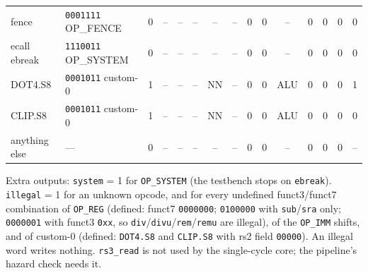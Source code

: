\documentclass[10pt]{article}
\newcommand{\sv}[1]{\texttt{#1}}
\begin{document}
\begin{center}
\begin{tabular}{l l c c c l c c c c c c c c c}
fence                   & \sv{0001111} OP\_FENCE  & 0 & --& --& --       & --  & --  & 0 & 0 & --  & 0 & 0 & 0 & 0\\
ecall ebreak            & \sv{1110011} OP\_SYSTEM & 0 & --& --& --       & --  & --  & 0 & 0 & --  & 0 & 0 & 0 & 0\\
DOT4.S8                 & \sv{0001011} custom-0   & 1 & --& --& --       & NN  & --  & 0 & 0 & ALU & 0 & 0 & 0 & 1\\
CLIP.S8                 & \sv{0001011} custom-0   & 1 & --& --& --       & NN  & --  & 0 & 0 & ALU & 0 & 0 & 0 & 0\\
anything else           & ---                     & 0 & --& --& --       & --  & --  & 0 & 0 & --  & 0 & 0 & 0 & --\\
\bottomrule
\end{tabular}
\end{center}
\noindent Extra outputs: \sv{system} = 1 for \sv{OP\_SYSTEM} (the testbench stops on \sv{ebreak}).
\sv{illegal} = 1 for an unknown opcode, and for every undefined funct3/funct7 combination of
\sv{OP\_REG} (defined: funct7 \sv{0000000}; \sv{0100000} with \sv{sub}/\sv{sra} only; \sv{0000001} with funct3 \sv{0xx},
so \sv{div}/\sv{divu}/\sv{rem}/\sv{remu} are illegal), of the \sv{OP\_IMM} shifts, and of custom-0
(defined: \sv{DOT4.S8} and \sv{CLIP.S8} with rs2 field \sv{00000}). An illegal word writes nothing.
\sv{rs3\_read} is not used by the single-cycle core; the pipeline's hazard check needs it.
\end{document}
